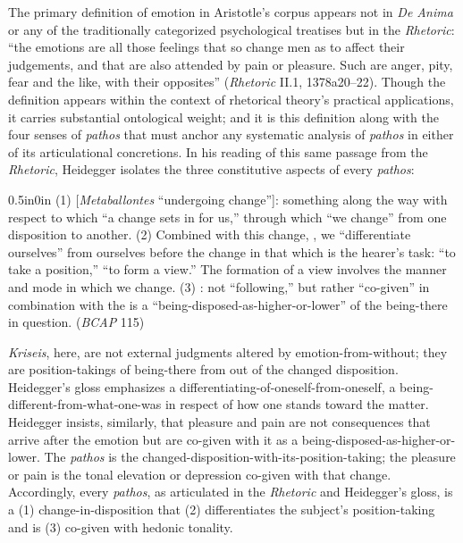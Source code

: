 The primary definition of emotion in Aristotle's corpus appears not in \textit{De Anima} or any of the traditionally categorized psychological treatises but in the \textit{Rhetoric}: ``the emotions are all those feelings that so change men as to affect their judgements, and that are also attended by pain or pleasure. Such are anger, pity, fear and the like, with their opposites'' (\textit{Rhetoric} II.1, 1378a20--22). Though the definition appears within the context of rhetorical theory's practical applications, it carries substantial ontological weight; and it is this definition along with the four senses of \textit{pathos} that must anchor any systematic analysis of \textit{pathos} in either of its articulational concretions. In his reading of this same passage from the \textit{Rhetoric}, Heidegger isolates the three constitutive aspects of every \textit{pathos}:
\begin{adjustwidth}{0.5in}{0in}
(1)  [\textit{Metaballontes} ``undergoing change'']: something along the way with respect to which ``a change sets in for us,'' through which ``we change'' from one disposition to another. (2) Combined with this change, , we ``differentiate ourselves'' from ourselves before the change in that which is the hearer's task: ``to take a position,'' ``to form a view.'' The formation of a view involves the manner and mode in which we change. (3) : not ``following,'' but rather ``co-given'' in combination with the  is a ``being-disposed-as-higher-or-lower'' of the being-there in question. (\textit{BCAP} 115)
\end{adjustwidth}
\textit{Kriseis}, here, are not external judgments altered by emotion-from-without; they are position-takings of being-there from out of the changed disposition. Heidegger's gloss emphasizes a differentiating-of-oneself-from-oneself, a being-different-from-what-one-was in respect of how one stands toward the matter. Heidegger insists, similarly, that pleasure and pain are not consequences that arrive after the emotion but are co-given with it as a being-disposed-as-higher-or-lower. The \textit{pathos} is the changed-disposition-with-its-position-taking; the pleasure or pain is the tonal elevation or depression co-given with that change. Accordingly, every \textit{pathos}, as articulated in the \textit{Rhetoric} and Heidegger's gloss, is a (1) change-in-disposition that (2) differentiates the subject's position-taking and is (3) co-given with hedonic tonality.

